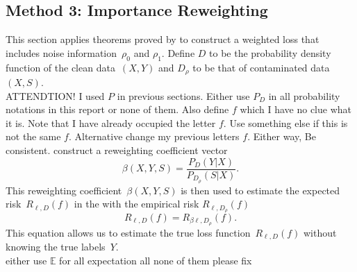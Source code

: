 \documentclass[12pt]{article} %
\newcommand{\loss}{\ell}
\begin{document}
\subsection{Method 3: Importance Reweighting} \label{3rd}
This section applies theorems proved by \citet{liu2016classification} to construct a weighted loss that includes noise information~$\rho_0$ and $\rho_1$. Define $D$ to be the probability density function of the clean data~$(X,Y)$ and $D_\rho$ to be that of contaminated data~$(X,S)$. \\{\color{red} ATTENDTION! I used $P$ in previous sections. Either use $P_D$ in all probability notations in this report or none of them. Also define $f$ which I have no clue what it is. Note that I have already occupied the letter $f$. Use something else if this is not the same $f$. Alternative change my previous letters $f$. Either way, Be consistent}.
\citet{liu2016classification} construct a reweighting coefficient vector~
\begin{equation}
\beta(X,Y,S)=\frac{P_D(Y|X)}{P_{D_\rho}(S|X)}. \label{beta} 
\end{equation}
This reweighting coefficient~$\beta(X,Y,S)$ is then used to estimate the expected risk~$R_{\loss,D}(f)$ in the with the empirical risk $R_{\loss,D_\rho}(f)$
\begin{equation*}
R_{\loss,D}(f) = R_{\beta \loss,D_\rho}(f). 
\end{equation*}
This equation allows us to estimate the true loss function~$R_{\loss,D}(f)$ without knowing the true labels~$Y$. 
\\{\color{red} either use $\mathbb E$ for all expectation all none of them please fix}\\%
\end{document}
